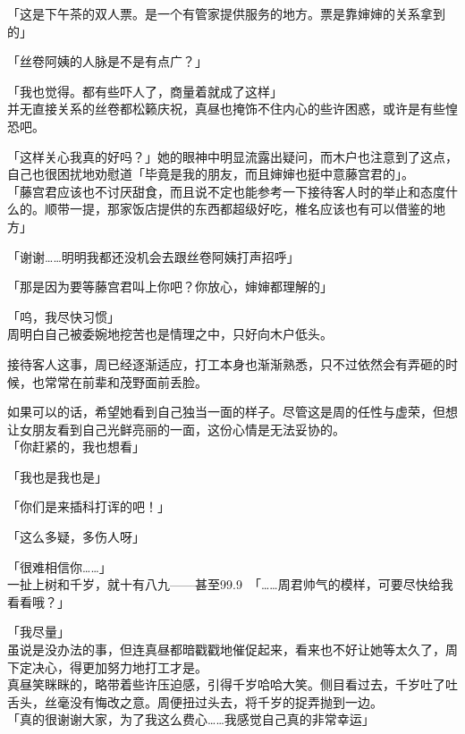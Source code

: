 「这是下午茶的双人票。是一个有管家提供服务的地方。票是靠婶婶的关系拿到的」

「丝卷阿姨的人脉是不是有点广？」

「我也觉得。都有些吓人了，商量着就成了这样」\\

并无直接关系的丝卷都松籁庆祝，真昼也掩饰不住内心的些许困惑，或许是有些惶恐吧。

「这样关心我真的好吗？」她的眼神中明显流露出疑问，而木户也注意到了这点，自己也很困扰地劝慰道「毕竟是我的朋友，而且婶婶也挺中意藤宫君的」。\\

「藤宫君应该也不讨厌甜食，而且说不定也能参考一下接待客人时的举止和态度什么的。顺带一提，那家饭店提供的东西都超级好吃，椎名应该也有可以借鉴的地方」

「谢谢……明明我都还没机会去跟丝卷阿姨打声招呼」

「那是因为要等藤宫君叫上你吧？你放心，婶婶都理解的」

「呜，我尽快习惯」\\

周明白自己被委婉地挖苦也是情理之中，只好向木户低头。

接待客人这事，周已经逐渐适应，打工本身也渐渐熟悉，只不过依然会有弄砸的时候，也常常在前辈和茂野面前丢脸。

如果可以的话，希望她看到自己独当一面的样子。尽管这是周的任性与虚荣，但想让女朋友看到自己光鲜亮丽的一面，这份心情是无法妥协的。\\

「你赶紧的，我也想看」

「我也是我也是」

「你们是来插科打诨的吧！」

「这么多疑，多伤人呀」

「很难相信你……」\\

一扯上树和千岁，就十有八九——甚至99.9\
「……周君帅气的模样，可要尽快给我看看哦？」

「我尽量」\\

虽说是没办法的事，但连真昼都暗戳戳地催促起来，看来也不好让她等太久了，周下定决心，得更加努力地打工才是。\\

真昼笑眯眯的，略带着些许压迫感，引得千岁哈哈大笑。侧目看过去，千岁吐了吐舌头，丝毫没有悔改之意。周便扭过头去，将千岁的捉弄抛到一边。\\

「真的很谢谢大家，为了我这么费心……我感觉自己真的非常幸运」\\

